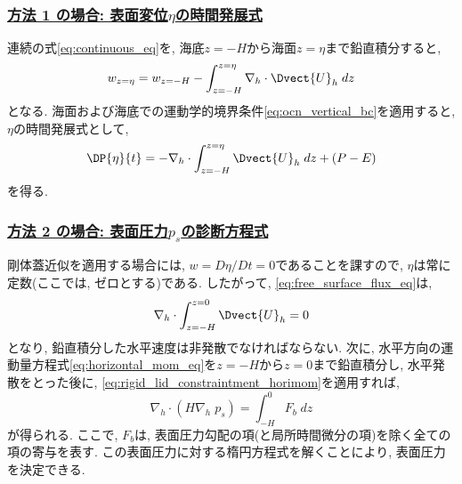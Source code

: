 \subsubsection*{ \underline{方法 1 の場合: 表面変位$\eta$の時間発展式} }
連続の式\eqref{eq:continuous_eq}を, 海底$z=-H$から海面$z=\eta$まで鉛直積分すると, 
\begin{equation*}
  w_{z=\eta} = w_{z=-H} - \int_{z=-H}^{z=\eta} \nabla_h \cdot \Dvect{U}_h \; dz
\end{equation*}
となる. 
海面および海底での運動学的境界条件\eqref{eq:ocn_vertical_bc}を適用すると, 
$\eta$の時間発展式として, 
\begin{equation}
  \DP{\eta}{t} = - \nabla_h \cdot \int_{z=-H}^{z=\eta} \Dvect{U}_h \; dz
                 + (P - E)
\label{eq:free_surface_flux_eq}
\end{equation}
を得る. 

\subsubsection*{ \underline{方法 2 の場合: 表面圧力$p_s$の診断方程式} }
剛体蓋近似を適用する場合には, $w=D\eta/Dt=0$であることを課すので, 
$\eta$は常に定数(ここでは, ゼロとする)である. したがって, 
\eqref{eq:free_surface_flux_eq}は, 
\begin{equation}
 \nabla_h \cdot \int_{z=-H}^{z=0} \Dvect{U}_h = 0
\label{eq:rigid_lid_constraintment_horimom}
\end{equation}
となり, 鉛直積分した水平速度は非発散でなければならない. 
次に, 水平方向の運動量方程式\eqref{eq:horizontal_mom_eq}を$z=-H$から$z=0$まで鉛直積分し, 
水平発散をとった後に, \eqref{eq:rigid_lid_constraintment_horimom}を適用すれば, 
\begin{equation}
 \nabla_h \cdot ( H \nabla_h \; p_s) = \int_{-H}^0 F_b \; dz
\label{eq:rigid_lid_pressure_poisson}
\end{equation}
が得られる. 
ここで, $F_b$は, 表面圧力勾配の項(と局所時間微分の項)を除く全ての項の寄与を表す. 
この表面圧力に対する楕円方程式を解くことにより, 表面圧力を決定できる. 

